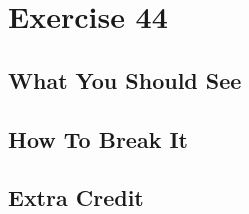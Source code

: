 \chapter{Exercise 44}


\section{What You Should See}


\section{How To Break It}


\section{Extra Credit}



